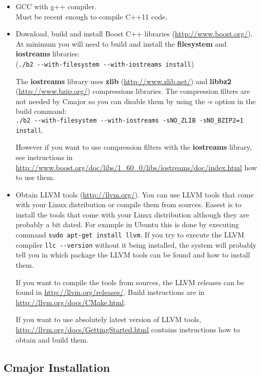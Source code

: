 \documentclass[oneside, a4paper, 11pt]{article}
\begin{document}
\begin{itemize}

\item
GCC with g++ compiler.\\
Must be recent enough to compile C++11 code.

\item
Download, build and install Boost C++ libraries
(\url{http://www.boost.org/}).
At minimum you will need to build and install the
\textbf{filesystem} and \textbf{iostreams} libraries:\\
(\verb|./b2 --with-filesystem --with-iostreams install|)

The \textbf{iostreams} library uses \textbf{zlib} (\url{http://www.zlib.net/}) and
\textbf{libbz2} (\url{http://www.bzip.org/}) compressions libraries.
The compression filters are not needed by Cmajor so you can disable them by
using the -s option in the build command:\\
\verb|./b2 --with-filesystem --with-iostreams -sNO_ZLIB -sNO_BZIP2=1 install|.

However if you want to use compression filters with the \textbf{iostreams} library,
see instructions in \url{http://www.boost.org/doc/libs/1_60_0/libs/iostreams/doc/index.html}
how to use them.

\item
Obtain LLVM tools (\url{http://llvm.org/}).
You can use LLVM tools that come with your Linux distribution or compile them from sources.
Easest is to install the tools that come with your Linux distribution although they are
probably a bit dated. For example in Ubuntu this is done by executing command
\verb|sudo apt-get install llvm|. If you try to execute the LLVM compiler \verb|llc --version|
without it being installed, the system will probably tell you in which package the LLVM tools
can be found and how to install them.

If you want to compile the tools from sources, the LLVM releases can be found in \url{http://llvm.org/releases/}.
Build instructions are in \url{http://llvm.org/docs/CMake.html}.

If you want to use absolutely latest version of LLVM tools, \url{http://llvm.org/docs/GettingStarted.html}
contains instructions how to obtain and build them.

\end{itemize}

\subsection{Cmajor Installation}
\end{document}
